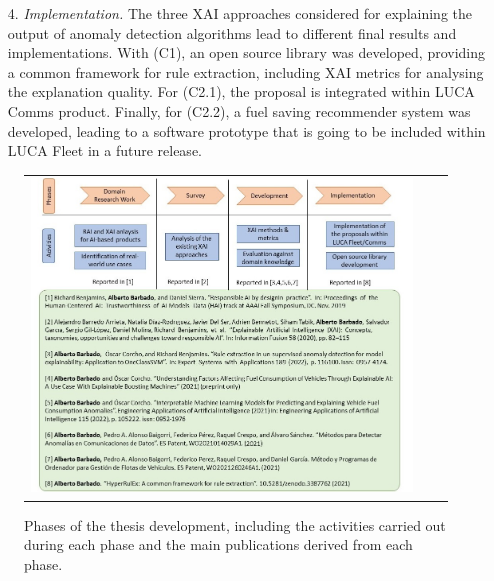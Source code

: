 \begin{itemize}
\item[4.] \textit{Implementation.} The three XAI approaches considered for explaining the output of anomaly detection algorithms lead to different final results and implementations. 
With (C1), an open source library was developed, providing a common framework for rule extraction, including XAI metrics for analysing the explanation quality. For (C2.1), the proposal is integrated within LUCA Comms product. Finally, for (C2.2), a fuel saving recommender system was developed, leading to a software prototype that is going to be included within LUCA Fleet in a future release.
\end{itemize}

\begin{figure}[h!]
\centering
  \begin{tabular}{c@{\qquad}c@{\qquad}c}
  \includegraphics[width=0.9\columnwidth]{figures/ResearchMethodology.jpg}
  \end{tabular} 
  \caption{Phases of the thesis development, including the activities carried out during
each phase and the main publications derived from each phase.}
  \label{fig:ResearchMethodologyFigure}
\end{figure}


\newpage